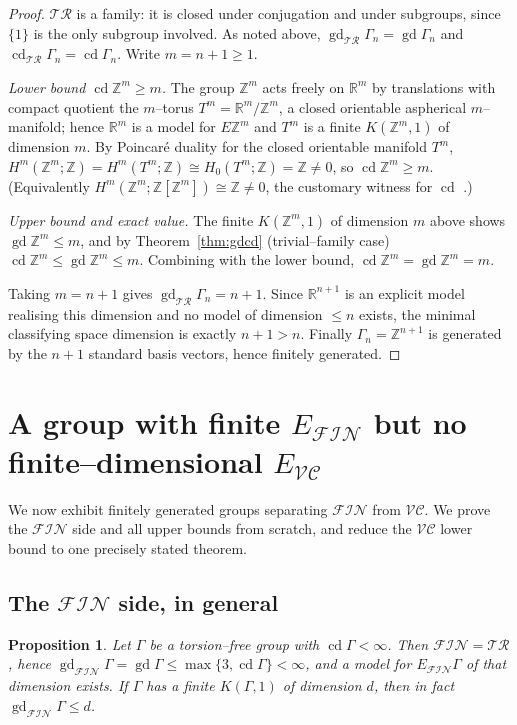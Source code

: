 \documentclass{amsart}
\newtheorem{proposition}{Proposition}
\theoremstyle{definition}
\newcommand{\Z}{\mathbb{Z}}
\newcommand{\R}{\mathbb{R}}
\newcommand{\FIN}{\mathcal{F\!I\!N}}
\newcommand{\VC}{\mathcal{V\!C}}
\newcommand{\gd}{\operatorname{gd}}
\newcommand{\cd}{\operatorname{cd}}
\begin{document}
\begin{proof}
$\mathcal{TR}$ is a family: it is closed under conjugation and under subgroups, since
$\{1\}$ is the only subgroup involved. As noted above,
$\gd_{\mathcal{TR}}\Gamma_n=\gd\Gamma_n$ and $\cd_{\mathcal{TR}}\Gamma_n=\cd\Gamma_n$. Write
$m=n+1\ge 1$.

\smallskip
\emph{Lower bound $\cd\Z^{m}\ge m$.} The group $\Z^{m}$ acts freely on $\R^{m}$ by
translations with compact quotient the $m$--torus $T^{m}=\R^{m}/\Z^{m}$, a closed orientable
aspherical $m$--manifold; hence $\R^{m}$ is a model for $E\Z^{m}$ and $T^{m}$ is a finite
$K(\Z^{m},1)$ of dimension $m$. By Poincaré duality for the closed orientable manifold
$T^{m}$, $H^{m}(\Z^{m};\Z)=H^{m}(T^{m};\Z)\cong H_{0}(T^{m};\Z)=\Z\ne 0$, so
$\cd\Z^{m}\ge m$. (Equivalently $H^{m}(\Z^{m};\Z[\Z^{m}])\cong\Z\ne0$, the customary
witness for $\cd$ \cite[\S VIII.2]{Brown}.)

\smallskip
\emph{Upper bound and exact value.} The finite $K(\Z^{m},1)$ of dimension $m$ above shows
$\gd\Z^{m}\le m$, and by Theorem~\ref{thm:gdcd} (trivial--family case)
$\cd\Z^{m}\le\gd\Z^{m}\le m$. Combining with the lower bound, $\cd\Z^{m}=\gd\Z^{m}=m$.

\smallskip
Taking $m=n+1$ gives $\gd_{\mathcal{TR}}\Gamma_n=n+1$. Since $\R^{n+1}$ is an explicit model
realising this dimension and no model of dimension $\le n$ exists, the minimal classifying
space dimension is exactly $n+1>n$. Finally $\Gamma_n=\Z^{n+1}$ is generated by the $n+1$
standard basis vectors, hence finitely generated.
\end{proof}

\section{A group with finite \texorpdfstring{$E_{\FIN}$}{E\_FIN} but no finite--dimensional
\texorpdfstring{$E_{\VC}$}{E\_VC}}

We now exhibit finitely generated groups separating $\FIN$ from $\VC$. We prove the $\FIN$
side and all upper bounds from scratch, and reduce the $\VC$ lower bound to one precisely
stated theorem.

\subsection{The $\FIN$ side, in general}

\begin{proposition}\label{prop:finside}
Let $\Gamma$ be a torsion--free group with $\cd\Gamma<\infty$. Then $\FIN=\mathcal{TR}$, hence
$\gd_{\FIN}\Gamma=\gd\Gamma\le\max\{3,\cd\Gamma\}<\infty$, and a model for $E_{\FIN}\Gamma$ of
that dimension exists. If $\Gamma$ has a finite $K(\Gamma,1)$ of dimension $d$, then in fact
$\gd_{\FIN}\Gamma\le d$.
\end{proposition}
\end{document}
